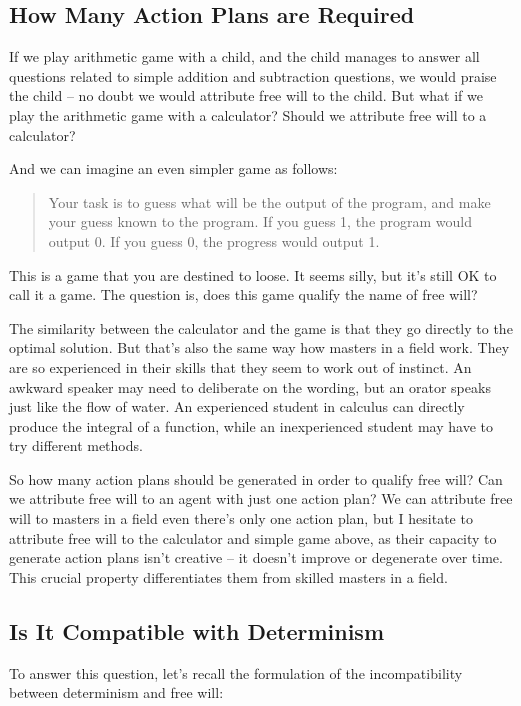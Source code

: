 \subsection{How Many Action Plans are Required}

If we play arithmetic game with a child, and the child manages to answer all questions related to simple addition and subtraction questions, we would praise the child -- no doubt we would attribute free will to the child. But what if we play the arithmetic game with a calculator? Should we attribute free will to a calculator?

And we can imagine an even simpler game as follows:

\begin{quote}
  Your task is to guess what will be the output of the program, and make your guess known to the program. If you guess 1, the program would output 0. If you guess 0, the progress would output 1.
\end{quote}

This is a game that you are destined to loose. It seems silly, but it's still OK to call it a game. The question is, does this game qualify the name of free will?

The similarity between the calculator and the game is that they go directly to the optimal solution. But that's also the same way how masters in a field work. They are so experienced in their skills that they seem to work out of instinct. An awkward speaker may need to deliberate on the wording, but an orator speaks just like the flow of water. An experienced student in calculus can directly produce the integral of a function, while an inexperienced student may have to try different methods.

So how many action plans should be generated in order to qualify free will? Can we attribute free will to an agent with just one action plan? We can attribute free will to masters in a field even there's only one action plan, but I hesitate to attribute free will to the calculator and simple game above, as their capacity to generate action plans isn't creative -- it doesn't improve or degenerate over time. This crucial property differentiates them from skilled masters in a field.

\subsection{Is It Compatible with Determinism}

To answer this question, let's recall the formulation of the incompatibility between determinism and free will:

